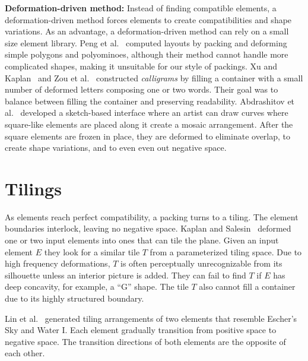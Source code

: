 \textbf{Deformation-driven method:}
Instead of finding compatible elements,
a deformation-driven method forces elements to create compatibilities and shape variations.
As an advantage, a deformation-driven method can rely on a small size element library.
Peng et al.~\cite{Peng2014} computed layouts by packing and deforming
simple polygons and polyominoes, although their method cannot handle more
complicated shapes, making it unsuitable for our style of packings.
Xu and Kaplan~\cite{Xu2007} and Zou et al.~\cite{Zou2016}
constructed \textit{calligrams} by filling a container with a small
number of deformed letters composing one or two words.  
Their goal was to balance between filling the container and preserving readability.
Abdrashitov et al.~\cite{Abdrashitov2014} developed
a sketch-based interface where an artist can draw curves where square-like elements are placed along it
create a mosaic arrangement.
After the square elements are frozen in place, 
they are deformed to eliminate overlap, to create shape variations, 
and to even even out negative space.  


\section{Tilings}
As elements reach perfect compatibility, a packing turns to a tiling.
The element boundaries interlock, leaving no negative space.
Kaplan and Salesin~\cite{Kaplan2000, Kaplan2004} deformed one or two 
input elements into ones that can tile the plane.
Given an input element $E$ they look for a similar tile $T$
from a parameterized tiling space.
Due to high frequency deformations,
$T$ is often perceptually unrecognizable from its silhouette unless an interior picture is added.
They can fail to find $T$ if $E$ has deep concavity, for example, a ``G'' shape.
The tile $T$ also cannot fill a container due to its highly structured boundary.

Lin et al.~\cite{Lin2018} generated tiling arrangements of two elements that resemble Escher's Sky and Water I.
Each element gradually transition from positive space to negative space. 
The transition directions of both elements are the opposite of each other.



